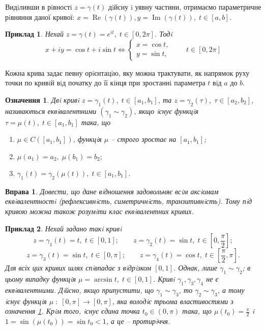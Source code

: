 \documentclass[10pt]{report} %
\renewcommand\Re{\operatorname{Re}}
\renewcommand\Im{\operatorname{Im}}
\newtheorem{definition}{Означення}[section]
\newtheorem{example}{\indent Приклад}[section]
\newtheorem{exercise}{Вправа}
\begin{document}
Видiливши в рiвностi $z = \gamma(t)$ дiйсну i уявну частини, отримаємо параметричне рiвняння даної кривої: $x=\Re(\gamma(t)),y=\Im(\gamma(t)),
\;t\in[a, b]$.
\begin{example}
Нехай $z = \gamma(t) = e^{it},\;t\in[0, 2\pi]$. Тодi
\[x+iy=\cos t+i\sin t\iff\left\{\begin{aligned}x=\cos t,\\ y=\sin t,\end{aligned}\right.\qquad t\in[0,2\pi]\]
\end{example}

Кожна крива задає певну орiєнтацiю, яку можна трактувати, як напрямок руху точки по кривiй вiд початку до її кiнця при зростаннi параметра
 $t$ вiд $a$ до $b$.
\begin{definition}\label{ComplexCurveEq}
Двi кривi $z=\gamma_1(t),\;t\in [a_1,b_1]$, та $z=\gamma_2(\tau),\;\tau\in [a_2,b_2]$, називаються еквiвалентними $(\gamma_1\sim\gamma_2)$,
якщо iснує функцiя $\tau=\mu(t),\;t\in [a_1,b_1]$ така, що
\begin{enumerate}
\item{$\mu\in C([a_1,b_1])$, функцiя $\mu$ -- строго зростає на $[a_1,b_1]$;}
\item{$\mu(a_1)=a_2,\;\mu(b_1)=b_2;$}
\item{$\gamma_1(t)=\gamma_2\left(\mu(t)\right),\;t\in [a_1,b_1]$.}
\end{enumerate}
\end{definition}
\begin{exercise}
Довести, що дане вiдношення задовольняє всiм аксiомам еквiвалентностi (рефлексивнiсть, симетричнiсть, транзитивнiсть). Тому пiд кривою можна 
також розумiти клас еквiвалентних кривих.
\end{exercise}
\begin{example}\label{ComplexCurveEquivalenceExample}
Нехай задано такi кривi
\[z=\gamma_1(t)=t,\;t\in [0,1];\qquad z=\gamma_2(t)=\sin t,\; t\in[0,\frac{\pi}{2}];\]
\[z=\gamma_3(t)=\sin t,\;t\in [0,\pi];\qquad z=\gamma_4(t)=\cos t,\; t\in[\frac{\pi}{2},\pi].\]
Для всіх цих кривих шлях спiвпадає з вiдрiзком $[0,1]$. Однак, лише $\gamma_1\sim\gamma_2$; в цьому випадку функцiя $\mu=\arcsin t,\;t\in[0,1]$.
Кривi $\gamma_1,\gamma_3,\gamma_4$ не є еквiвалентними. Дiйсно, якщо припустити, що $\gamma_1\sim\gamma_3$, то $\gamma_2\sim\gamma_3$,  а тому
 iснує функцiя $\mu\;:\;[0, \pi ] \to [0, \pi]$, яка володiє трьома властивостями з означення \ref{ComplexCurveEq}. Крiм того, iснує єдина точка
 $t_0\in (0,\pi )$ така, що $\mu(t_0 ) =\frac{\pi}{2}$ i $1 = \sin(\mu(t_0 )) = \sin t_0 < 1$, а це -- протирiччя.
\end{example}
\end{document}
